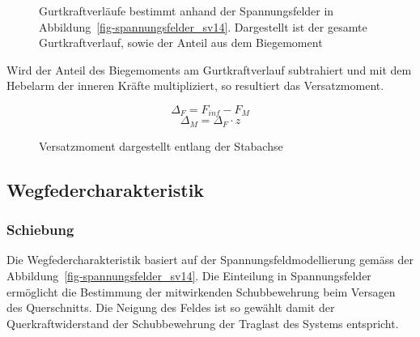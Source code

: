 \documentclass[
  11pt,
  letterpaper,
]{scrreprt}
\begin{document}
\begin{figure}[H]


\caption{\label{fig-gurtkraft_sv14}Gurtkraftverläufe bestimmt anhand der
Spannungsfelder in Abbildung~\ref{fig-spannungsfelder_sv14}. Dargestellt
ist der gesamte Gurtkraftverlauf, sowie der Anteil aus dem Biegemoment}

\end{figure}%

Wird der Anteil des Biegemoments am Gurtkraftverlauf subtrahiert und mit
dem Hebelarm der inneren Kräfte multipliziert, so resultiert das
Versatzmoment.

\[
\Delta_F = F_{inf} - F_M
\] \[
\Delta_M = \Delta_F \cdot z
\]

\begin{figure}[H]


\caption{\label{fig-versatzmoment_sv14}Versatzmoment dargestellt entlang
der Stabachse}

\end{figure}%

\subsection{Wegfedercharakteristik}\label{wegfedercharakteristik}

\subsubsection{Schiebung}\label{schiebung}

Die Wegfedercharakteristik basiert auf der Spannungsfeldmodellierung
gemäss der Abbildung~\ref{fig-spannungsfelder_sv14}. Die Einteilung in
Spannungsfelder ermöglicht die Bestimmung der mitwirkenden
Schubbewehrung beim Versagen des Querschnitts. Die Neigung des Feldes
ist so gewählt damit der Querkraftwiderstand der Schubbewehrung der
Traglast des Systems entspricht.
\end{document}
